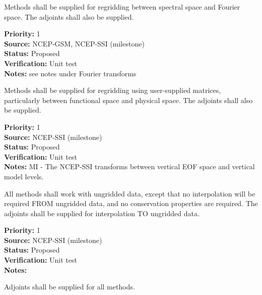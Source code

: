 Methods shall be supplied for regridding between spectral space and
Fourier space.  The adjoints shall also be supplied.

\begin{reqlist}
{\bf Priority:} 1 \\
{\bf Source:}  NCEP-GSM, NCEP-SSI (milestone) \\
{\bf Status:} Proposed \\
{\bf Verification:} Unit test \\
{\bf Notes:} see notes under Fourier transforms
\end{reqlist}


Methods shall be supplied for regridding using user-supplied matrices,
particularly between functional space and physical space.
The adjoints shall also be supplied.

\begin{reqlist}
{\bf Priority:} 1 \\
{\bf Source:}  NCEP-SSI (milestone) \\
{\bf Status:} Proposed \\
{\bf Verification:} Unit test \\
{\bf Notes:} MI - The NCEP-SSI transforms between vertical EOF space
             and vertical model levels.
\end{reqlist}


All methods shall work with ungridded data, except that
no interpolation will be required FROM ungridded data,
and no conservation properties are required.
The adjoints shall be supplied for interpolation TO ungridded data.

\begin{reqlist}
{\bf Priority:} 1 \\
{\bf Source:}  NCEP-SSI (milestone) \\
{\bf Status:} Proposed \\
{\bf Verification:} Unit test \\
{\bf Notes:} 
\end{reqlist}


Adjoints shall be supplied for all methods.

